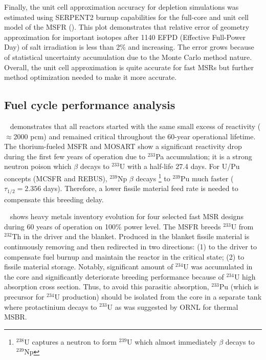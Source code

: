 \documentclass[letterpaper]{mandc2019}
\begin{document}
Finally, the unit cell approximation accuracy for depletion simulations was estimated using SERPENT2 burnup capabilities for the full-core and unit cell model of the \gls{MSFR} (). This plot demonstrates that relative error of geometry approximation for important isotopes after 1140 EFPD (Effective Full-Power Day) of salt irradiation is less than 2\% and increasing. The error grows because of statistical uncertainty accumulation due to the Monte Carlo method nature. Overall, the unit cell approximation is quite accurate for fast \gls{MSR}s but further method optimization needed to make it more accurate.
\subsection{Fuel cycle performance analysis}
\label{sec:performance}
~ demonstrates that all reactors started with the same small excess of reactivity ($\approx$2000 pcm) and remained critical throughout the 60-year operational lifetime. The thorium-fueled \gls{MSFR} and \gls{MOSART} show a significant reactivity drop during the first few years of operation due to $^{233}$Pa accumulation; it is a strong neutron poison which $\beta$ decays to $^{233}$U with a half-life 27.4 days. For U/Pu concepts (\gls{MCSFR} and REBUS), $^{239}$Np $\beta$ decays \footnote{$^{238}$U captures a neutron to form $^{239}$U which almost immediately $\beta$ decays to $^{239}$Np} to $^{239}$Pu much faster ($\tau_{1/2}=2.356$ days). Therefore, a lower fissile material feed rate is needed to compensate this breeding delay.

~ shows heavy metals inventory evolution for four selected fast \gls{MSR} designs during 60 years of operation on 100\% power level. The \gls{MSFR} breeds $^{233}$U from $^{232}$Th in the driver and the blanket. Produced in the blanket fissile material is continuously removing and then redirected in two directions: (1) to the driver to compensate fuel burnup and maintain the reactor in the critical state; (2) to fissile material storage. Notably, significant amount of $^{234}$U was accumulated in the core and significantly deteriorate breeding performance because of $^{234}$U high absorption cross section. Thus, to avoid this parasitic absorption, $^{233}$Pu (which is precursor for $^{234}$U production) should be isolated from the core in a separate tank where protactinium decays to $^{233}$U as was suggested by \gls{ORNL} for thermal \gls{MSBR}.
\end{document}
